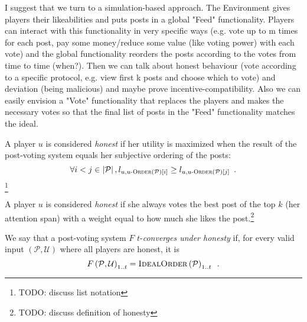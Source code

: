       I suggest that we turn to a simulation-based approach. The Environment
      gives players their likeabilities and puts posts in a global "Feed"
      functionality. Players can interact with this functionality in very
      specific ways (e.g. vote up to m times for each post, pay some
      money/reduce some value (like voting power) with each vote) and the global
      functionality reorders the posts according to the votes from time to time
      (when?). Then we can talk about honest behaviour (vote according to a
      specific protocol, e.g. view first k posts and choose which to vote) and
      deviation (being malicious) and maybe prove incentive-compatibility. Also
      we can easily envision a "Vote" functionality that replaces the players
      and makes the necessary votes so that the final list of posts in the
      "Feed" functionality matches the ideal.

    \begin{definition}
      A player $u$ is considered \emph{honest} if her utility is maximized
      when the result of the post-voting system equals her subjective ordering
      of the posts:
      \begin{equation*}
        \forall i < j \in \left|\mathcal{P}\right|, l_{u, u\textsc{-Order}
        \left(\mathcal{P}\right)\left[i\right]} \geq l_{u, u\textsc{-Order}
        \left(\mathcal{P}\right)\left[j\right]}
        \enspace.
      \end{equation*}\footnote{TODO: discuss list notation}
    \end{definition}

    \begin{definition}
      A player $u$ is considered \emph{honest} if she always votes the best post
      of the top $k$ (her attention span) with a weight equal to how much she
      likes the post.\footnote{TODO: discuss definition of honesty}
    \end{definition}

    \begin{definition}
      We say that a post-voting system $F$ $t$-\emph{converges under honesty}
      if, for every valid input $\left(\mathcal{P}, \mathcal{U}\right)$ where
      all players are honest, it is
      \begin{equation*}
        F\left(\mathcal{P}, \mathcal{U}\right)_{1..t} =
        \textsc{IdealOrder}\left(\mathcal{P}\right)_{1..t} \enspace.
      \end{equation*}
    \end{definition}

